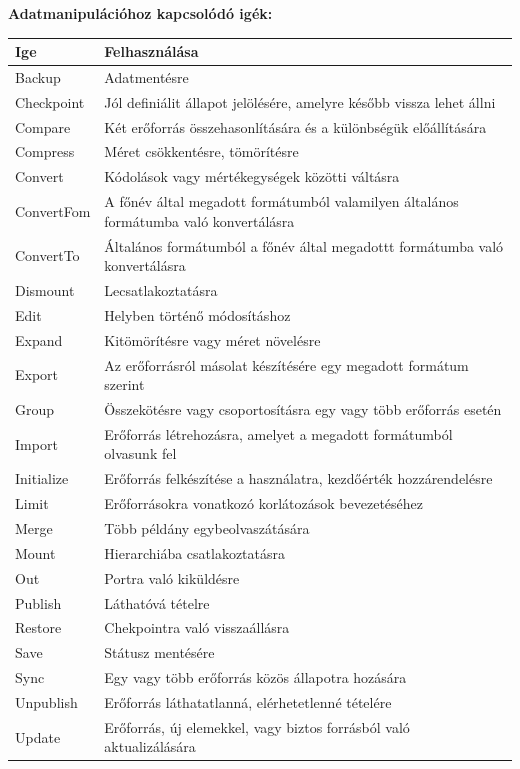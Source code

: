 \documentclass[12pt,oneside,justify,table]{book}
\begin{document}
\begin{appendices}
\noindent \textbf{Adatmanipulációhoz kapcsolódó igék:} \cite{VerbsData}\\
\begin{tabularx}{\linewidth}{l|X}
\rowcolor{blue!50}
\textbf{Ige} & \textbf{Felhasználása} \\
\hline
Backup & Adatmentésre \\
Checkpoint & Jól definiálit állapot jelölésére, amelyre később vissza lehet állni \\
Compare & Két erőforrás összehasonlítására és a különbségük előállítására \\
Compress & Méret csökkentésre, tömörítésre \\
Convert & Kódolások vagy mértékegységek közötti váltásra \\
ConvertFom & A főnév által megadott formátumból valamilyen általános formátumba való konvertálásra \\
ConvertTo & Általános formátumból a főnév által megadottt formátumba való konvertálásra \\
Dismount & Lecsatlakoztatásra \\
Edit & Helyben történő módosításhoz \\
Expand & Kitömörítésre vagy méret növelésre \\
Export & Az erőforrásról másolat készítésére egy megadott formátum szerint \\
Group & Összekötésre vagy csoportosításra egy vagy több erőforrás esetén \\
Import & Erőforrás létrehozásra, amelyet a megadott formátumból olvasunk fel \\
Initialize & Erőforrás felkészítése a használatra, kezdőérték hozzárendelésre \\
Limit & Erőforrásokra vonatkozó korlátozások bevezetéséhez \\
Merge & Több példány egybeolvaszátására \\
Mount & Hierarchiába csatlakoztatásra \\
Out & Portra való kiküldésre \\
Publish & Láthatóvá tételre \\
Restore & Chekpointra való visszaállásra \\
Save & Státusz mentésére \\
Sync & Egy vagy több erőforrás közös állapotra hozására \\
Unpublish & Erőforrás láthatatlanná, elérhetetlenné tételére \\
Update & Erőforrás, új elemekkel, vagy biztos forrásból való aktualizálására \\
\end{tabularx}
\break


\end{appendices}
\end{document}
